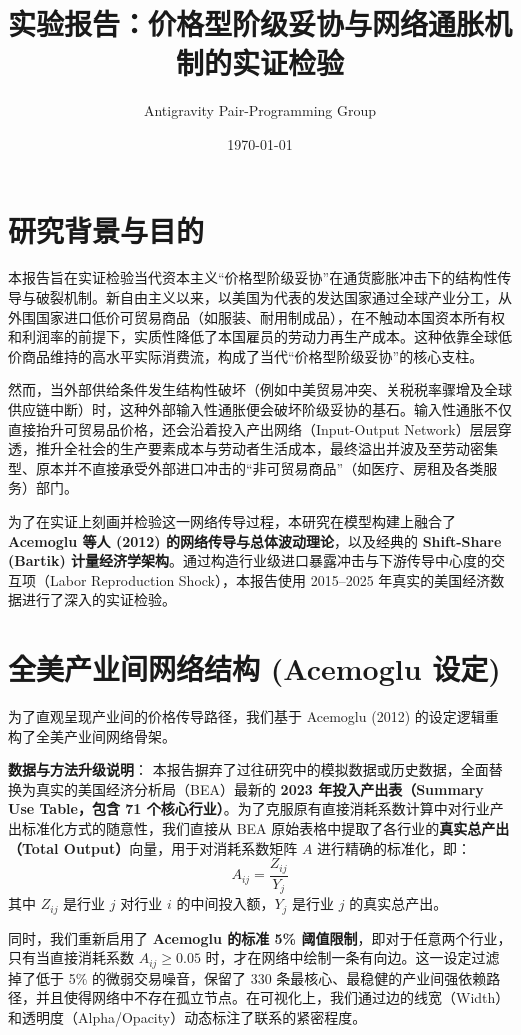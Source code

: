 \documentclass[UTF8,a4paper,11pt]{ctexart}
\title{\textbf{实验报告：价格型阶级妥协与网络通胀机制的实证检验}}
\author{Antigravity Pair-Programming Group}
\date{\today}
\begin{document}
\maketitle

\section{研究背景与目的}
本报告旨在实证检验当代资本主义“价格型阶级妥协”在通货膨胀冲击下的结构性传导与破裂机制。新自由主义以来，以美国为代表的发达国家通过全球产业分工，从外围国家进口低价可贸易商品（如服装、耐用制成品），在不触动本国资本所有权和利润率的前提下，实质性降低了本国雇员的劳动力再生产成本。这种依靠全球低价商品维持的高水平实际消费流，构成了当代“价格型阶级妥协”的核心支柱。

然而，当外部供给条件发生结构性破坏（例如中美贸易冲突、关税税率骤增及全球供应链中断）时，这种外部输入性通胀便会破坏阶级妥协的基石。输入性通胀不仅直接抬升可贸易品价格，还会沿着投入产出网络（Input-Output Network）层层穿透，推升全社会的生产要素成本与劳动者生活成本，最终溢出并波及至劳动密集型、原本并不直接承受外部进口冲击的“非可贸易商品”（如医疗、房租及各类服务）部门。

为了在实证上刻画并检验这一网络传导过程，本研究在模型构建上融合了 \textbf{Acemoglu 等人 (2012) 的网络传导与总体波动理论}，以及经典的 \textbf{Shift-Share (Bartik) 计量经济学架构}。通过构造行业级进口暴露冲击与下游传导中心度的交互项（Labor Reproduction Shock），本报告使用 2015--2025 年真实的美国经济数据进行了深入的实证检验。

\section{全美产业间网络结构 (Acemoglu 设定)}
为了直观呈现产业间的价格传导路径，我们基于 Acemoglu (2012) 的设定逻辑重构了全美产业间网络骨架。

\textbf{数据与方法升级说明}：
本报告摒弃了过往研究中的模拟数据或历史数据，全面替换为真实的美国经济分析局（BEA）最新的 \textbf{2023 年投入产出表（Summary Use Table，包含 71 个核心行业）}。为了克服原有直接消耗系数计算中对行业产出标准化方式的随意性，我们直接从 BEA 原始表格中提取了各行业的\textbf{真实总产出（Total Output）}向量，用于对消耗系数矩阵 $A$ 进行精确的标准化，即：
\[A_{ij} = \frac{Z_{ij}}{Y_j}\]
其中 $Z_{ij}$ 是行业 $j$ 对行业 $i$ 的中间投入额，$Y_j$ 是行业 $j$ 的真实总产出。

同时，我们重新启用了 \textbf{Acemoglu 的标准 5\% 阈值限制}，即对于任意两个行业，只有当直接消耗系数 $A_{ij} \ge 0.05$ 时，才在网络中绘制一条有向边。这一设定过滤掉了低于 5\% 的微弱交易噪音，保留了 330 条最核心、最稳健的产业间强依赖路径，并且使得网络中不存在孤立节点。在可视化上，我们通过边的线宽（Width）和透明度（Alpha/Opacity）动态标注了联系的紧密程度。
\end{document}
